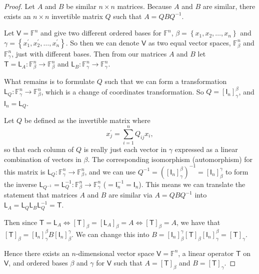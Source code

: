 \documentclass[11pt]{article}
\newcommand{\br}[1]{\left(#1\right)}
\newcommand{\sbr}[1]{\left[#1\right]}
\newcommand{\cbr}[1]{\left\{#1\right\}}
\begin{document}
\begin{proof}
  Let $A$ and $B$ be similar $n\times n$ matrices. Because $A$ and $B$ are similar, there exists an $n\times n$ invertible matrix $Q$ such that $A = QBQ^{-1}$. 

  Let $\mathsf{V} = \mathbb{F}^n$ and give two different ordered bases for $\mathbb{F}^n$, $\beta = \cbr{x_1,x_2,\dots,x_n}$ and $\gamma = \cbr{x^{\prime}_1,x^{\prime}_2,\dots,x^{\prime}_n}$. So then we can denote $\mathsf{V}$ as two equal vector spaces, $\mathbb{F}^n_{\beta}$ and $\mathbb{F}^n_{\gamma}$, just with different bases. Then from our matrices $A$ and $B$ let $\mathsf{T} = \mathsf{L}_A : \mathbb{F}^n_{\beta} \to \mathbb{F}^n_{\beta}$ and $\mathsf{L}_B: \mathbb{F}^n_{\gamma} \to \mathbb{F}^n_{\gamma}$.

  What remains is to formulate $Q$ such that we can form a transformation $\mathsf{L}_Q : \mathbb{F}^n_{\gamma}\to \mathbb{F}^n_{\beta}$, which is a change of coordinates transformation. So $Q = \sbr{\mathsf{I}_n}^{\beta}_{\gamma}$, and $\mathsf{I}_n = \mathsf{L}_Q$.
  
  Let $Q$ be defined as the invertible matrix where $$x^{\prime}_j = \sum_{i=1}^n Q_{ij}x_i,$$ so that each column of $Q$ is really just each vector in $\gamma$ expressed as a linear combination of vectors in $\beta$. The corresponding isomorphism (automorphism) for this matrix is $\mathsf{L}_Q : \mathbb{F}^n_{\gamma}\to \mathbb{F}^n_{\beta}$, and we can use $Q^{-1} = \br{\sbr{\mathsf{I}_n}^{\beta}_{\gamma}}^{-1} = \sbr{\mathsf{I}_n}^{\gamma}_{\beta}$ to form the inverse $\mathsf{L}_{Q^{-1}} = \mathsf{L}^{-1}_Q : \mathbb{F}^n_{\beta}\to  \mathbb{F}^n_{\gamma}$ ($=\mathsf{I}_n^{-1} = \mathsf{I}_n$). This means we can translate the statement that matrices $A$ and $B$ are similar via $A = QBQ^{-1}$ into $\mathsf{L}_A = \mathsf{L}_Q\mathsf{L}_B\mathsf{L}^{-1}_Q = \mathsf{T}$. 
  
  Then since $\mathsf{T} = \mathsf{L}_A \iff \sbr{\mathsf{T}}_{\beta} = \sbr{\mathsf{L}_A}_{\beta} = A \iff \sbr{\mathsf{T}}_{\beta} = A$, we have that $\sbr{\mathsf{T}}_{\beta} = \sbr{\mathsf{I}_n}^{\beta}_{\gamma} B \sbr{\mathsf{I}_n}^{\gamma}_{\beta}$. We can change this into $B = \sbr{\mathsf{I}_n}^{\gamma}_{\beta}\sbr{\mathsf{T}}_{\beta}\sbr{\mathsf{I}_n}^{\beta}_{\gamma} = \sbr{\mathsf{T}}_{\gamma} $. 
  
  Hence there exists an $n$-dimensional vector space $\mathsf{V} = \mathbb{F}^n$, a linear operator $\mathsf{T}$ on $\mathsf{V}$, and ordered bases $\beta$ and $\gamma$ for $\mathsf{V}$ such that $A=\sbr{\mathsf{T}}_{\beta}$ and $B=\sbr{\mathsf{T}}_{\gamma}$.
\end{proof}
\end{document}

